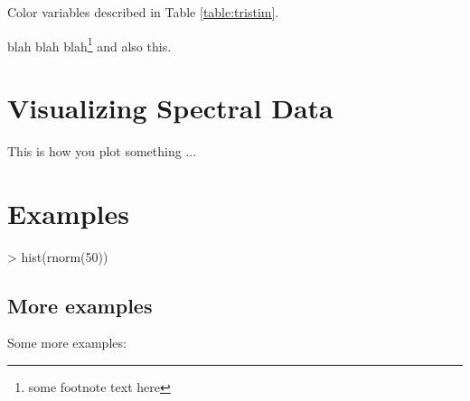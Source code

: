 \documentclass{article}
\begin{document}
Color variables described in Table \ref{table:tristim}.

blah blah blah\footnote{some footnote text here} and also this.

\section{Visualizing Spectral Data}

This is how you plot something ...



\section*{Examples}


\begin{Schunk}
\begin{Sinput}
> hist(rnorm(50))
\end{Sinput}
\end{Schunk}


\subsection*{More examples}

Some more examples:


\end{document}
